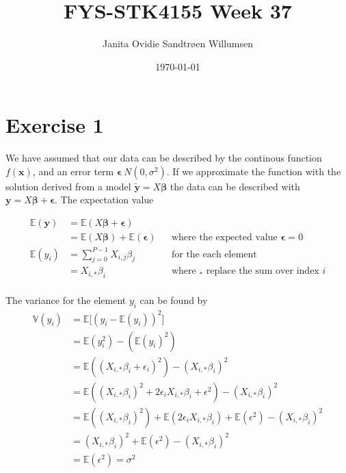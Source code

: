 \documentclass[english,notitlepage]{revtex4-1}
\begin{document}
\title{FYS-STK4155 Week 37}
\author{Janita Ovidie Sandtrøen Willumsen}
\date{\today}
\noaffiliation


\maketitle 


    
    
\section*{Exercise 1}
We have assumed that our data can be described by the continous function 
$f(\boldsymbol{x})$, and an error term $\boldsymbol{\epsilon} ~ N(0, \sigma^{2})$. 
If we approximate the function with the solution derived from a model $\boldsymbol{\tilde{y}} = X\boldsymbol{\beta}$ the data can be described with $\boldsymbol{y} = X\boldsymbol{\beta} + \boldsymbol{\epsilon}$. 
The expectation value 

\begin{align*}
    \mathbb{E}(\boldsymbol{y}) &= \mathbb{E}(X\boldsymbol{\beta} + \boldsymbol{\epsilon}) \\
    &= \mathbb{E}(X\boldsymbol{\beta}) + \mathbb{E}(\boldsymbol{\epsilon}) && \text{where the expected value $\boldsymbol{\epsilon} = 0$} \\
    \mathbb{E}(y_{i}) &= \sum_{j=0}^{P-1} X_{i,j} \beta_{j} && \text{for the each element} \\
    &= X_{i,*} \beta_{i} && \text{where $_{*}$ replace the sum over index $i$} \\
\end{align*}


The variance for the element $y_{i}$ can be found by
\begin{align*}
    \mathbb{V}(y_{i}) &= \mathbb{E} \big[ (y_{i} - \mathbb{E}(y_{i}))^{2} \big] \\
    &= \mathbb{E} (y_{i}^{2}) - (\mathbb{E}(y_{i})^{2}) \\
    &= \mathbb{E} ((X_{i,*} \beta_{i} + \epsilon_{i})^{2}) - (X_{i,*} \beta_{i})^{2} \\
    &= \mathbb{E} ((X_{i,*} \beta_{i})^{2} + 2\epsilon_{i}X_{i,*} \beta_{i} + \epsilon^{2}) - (X_{i,*} \beta_{i})^{2} \\
    &= \mathbb{E} ((X_{i,*} \beta_{i})^{2}) + \mathbb{E} (2\epsilon_{i}X_{i,*} \beta_{i}) + \mathbb{E} (\epsilon^{2}) - (X_{i,*} \beta_{i})^{2} \\
    &= (X_{i,*} \beta_{i})^{2} + \mathbb{E} (\epsilon^{2}) - (X_{i,*} \beta_{i})^{2} \\
    &= \mathbb{E} (\epsilon^{2}) = \sigma^{2} \\
\end{align*}
\end{document}

